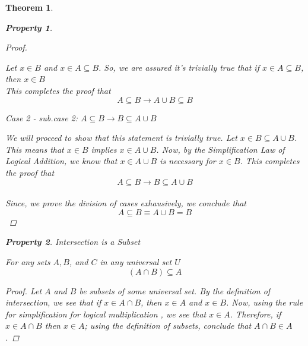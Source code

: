 \documentclass{book}
\newtheorem{theorem}{Theorem}[section]
\newtheorem{property}{Property}[theorem]
\theoremstyle{definition}
\theoremstyle{remark}
\begin{document}
\begin{theorem}
\begin{property}
\begin{proof}
                        \begin{flushleft}  \end{flushleft}
                            Let $x \in B$ and $x \in A \subseteq B$. So, we are assured it's trivially true that if $x \in A \subseteq B$, then $x \in B$   \\
                    This completes the proof that $$ A \subseteq B \to A \cup B \subseteq B $$
                    
                \begin{flushleft} \textit{Case 2 - sub.case 2: $A \subseteq B \to B \subseteq A \cup B$} \end{flushleft}
                    We will proceed to show that this statement is trivially true. Let $x \in B \subseteq A \cup B$. This means that $x \in B$ implies $x \in A \cup B$. Now, by the \textit{Simplification Law of Logical Addition}, we know that $x \in A \cup B$ is necessary for $x \in B$. This completes the proof that $$ A \subseteq B \to B \subseteq A \cup B $$ \\
            Since, we prove the division of cases exhausively, we conclude that $$ A \subseteq B \equiv A \cup B = B $$
        \end{proof}
    \end{property}
    
    
    
    \newpage
    \begin{property}
    Intersection is a Subset  \\
        \begin{tcolorbox}
            For any sets $A, B$, and $C$ in any universal set $U$
                \begin{equation*}
                    (A \cap B) \subseteq A
                \end{equation*}
        \end{tcolorbox}
    
        \begin{proof}
            Let $A$ and $B$ be subsets of some universal set. By the definition of intersection, we see that if $x \in A \cap B$, then $x \in A$ and $x \in B$. Now, using the rule for simplification for logical multiplication \footnotemark, we see that $x \in A$. Therefore, if $x \in A \cap B$ then $x \in A$; using the definition of subsets, conclude that $A \cap B \in A$.
            

\end{proof}
\end{property}
\end{theorem}
\end{document}
